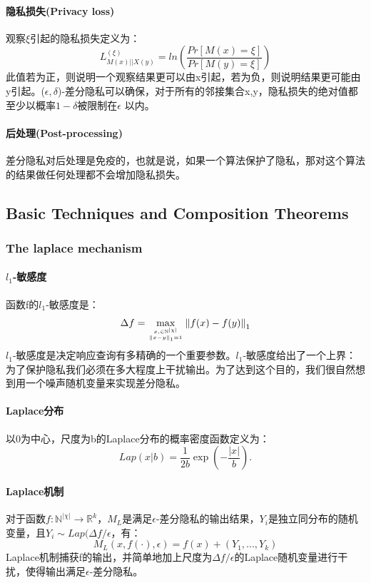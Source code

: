 \documentclass[12pt,a4paper]{article}
\begin{document}
\paragraph{隐私损失(Privacy loss)} 观察$\xi$引起的隐私损失定义为：
\begin{equation}
	L^{(\xi)}_{M(x)||X(y)}=ln(\frac{Pr[M(x)=\xi]}{Pr[M(y)=\xi]} )
\end{equation}
此值若为正，则说明一个观察结果更可以由x引起，若为负，则说明结果更可能由y引起。($\epsilon, \delta$)-差分隐私可以确保，对于所有的邻接集合x,y，隐私损失的绝对值都至少以概率$1-\delta$被限制在$\epsilon$ 以内。
\paragraph{后处理(Post-processing)} 差分隐私对后处理是免疫的，也就是说，如果一个算法保护了隐私，那对这个算法的结果做任何处理都不会增加隐私损失。
\subsection{Basic Techniques and Composition Theorems}
\subsubsection{The laplace mechanism}
\paragraph{$l_1$-敏感度} 函数f的$l_1$-敏感度是：
\begin{equation}
	\Delta f = \max_{x, \in \mathbb{N}^{|\chi|} \atop \left \| x-y \right \|_1=1} \left \| f(x)-f(y) \right \|_1
\end{equation}
$l_1$-敏感度是决定响应查询有多精确的一个重要参数。$l_1$-敏感度给出了一个上界：为了保护隐私我们必须在多大程度上干扰输出。为了达到这个目的，我们很自然想到用一个噪声随机变量来实现差分隐私。
\paragraph{Laplace分布} 以0为中心，尺度为b的Laplace分布的概率密度函数定义为：
\begin{equation}
	Lap(x|b)=\frac{1}{2b	}\exp(-\frac{|x|}{b}).
\end{equation}

\paragraph{Laplace机制} 对于函数$f:\mathbb{N}^{|\chi|} \rightarrow \mathbb{R}^k$，$M_L$是满足$\epsilon$-差分隐私的输出结果，$Y_i$是独立同分布的随机变量，且$Y_i \sim Lap(\Delta f / \epsilon$，有：
\begin{equation}
	M_L(x, f(\cdot), \epsilon )=f(x) + (Y_1, ... , Y_k)
\end{equation}
Laplace机制捕获f的输出，并简单地加上尺度为$\Delta f / \epsilon$的Laplace随机变量进行干扰，使得输出满足$\epsilon$-差分隐私。
\end{document}
